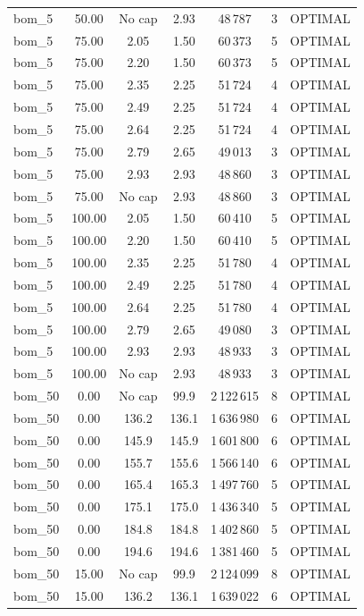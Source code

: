 \begin{table}[!htbp]
\begin{tabular}{lcccccc}
bom\_5 & 50.00 & No cap & 2.93 & 48\,787 & 3 & OPTIMAL \\
bom\_5 & 75.00 & 2.05 & 1.50 & 60\,373 & 5 & OPTIMAL \\
bom\_5 & 75.00 & 2.20 & 1.50 & 60\,373 & 5 & OPTIMAL \\
bom\_5 & 75.00 & 2.35 & 2.25 & 51\,724 & 4 & OPTIMAL \\
bom\_5 & 75.00 & 2.49 & 2.25 & 51\,724 & 4 & OPTIMAL \\
bom\_5 & 75.00 & 2.64 & 2.25 & 51\,724 & 4 & OPTIMAL \\
bom\_5 & 75.00 & 2.79 & 2.65 & 49\,013 & 3 & OPTIMAL \\
bom\_5 & 75.00 & 2.93 & 2.93 & 48\,860 & 3 & OPTIMAL \\
bom\_5 & 75.00 & No cap & 2.93 & 48\,860 & 3 & OPTIMAL \\
bom\_5 & 100.00 & 2.05 & 1.50 & 60\,410 & 5 & OPTIMAL \\
bom\_5 & 100.00 & 2.20 & 1.50 & 60\,410 & 5 & OPTIMAL \\
bom\_5 & 100.00 & 2.35 & 2.25 & 51\,780 & 4 & OPTIMAL \\
bom\_5 & 100.00 & 2.49 & 2.25 & 51\,780 & 4 & OPTIMAL \\
bom\_5 & 100.00 & 2.64 & 2.25 & 51\,780 & 4 & OPTIMAL \\
bom\_5 & 100.00 & 2.79 & 2.65 & 49\,080 & 3 & OPTIMAL \\
bom\_5 & 100.00 & 2.93 & 2.93 & 48\,933 & 3 & OPTIMAL \\
bom\_5 & 100.00 & No cap & 2.93 & 48\,933 & 3 & OPTIMAL \\
bom\_50 & 0.00 & No cap & 99.9 & 2\,122\,615 & 8 & OPTIMAL \\
bom\_50 & 0.00 & 136.2 & 136.1 & 1\,636\,980 & 6 & OPTIMAL \\
bom\_50 & 0.00 & 145.9 & 145.9 & 1\,601\,800 & 6 & OPTIMAL \\
bom\_50 & 0.00 & 155.7 & 155.6 & 1\,566\,140 & 6 & OPTIMAL \\
bom\_50 & 0.00 & 165.4 & 165.3 & 1\,497\,760 & 5 & OPTIMAL \\
bom\_50 & 0.00 & 175.1 & 175.0 & 1\,436\,340 & 5 & OPTIMAL \\
bom\_50 & 0.00 & 184.8 & 184.8 & 1\,402\,860 & 5 & OPTIMAL \\
bom\_50 & 0.00 & 194.6 & 194.6 & 1\,381\,460 & 5 & OPTIMAL \\
bom\_50 & 15.00 & No cap & 99.9 & 2\,124\,099 & 8 & OPTIMAL \\
bom\_50 & 15.00 & 136.2 & 136.1 & 1\,639\,022 & 6 & OPTIMAL \\

\end{tabular}
\end{table}
